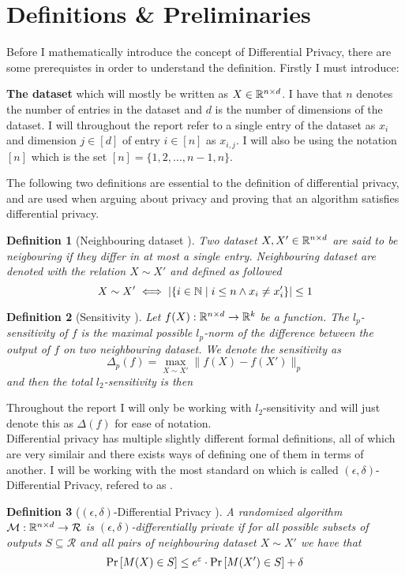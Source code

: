 \documentclass[a4paper,12pt]{article}
\newtheorem{definition}{Definition}[section]
\begin{document}
\section{Definitions \& Preliminaries}
Before I mathematically introduce the concept of Differential Privacy, there are some prerequistes in order to understand the definition.
Firstly I must introduce:

\textbf{The dataset} which will mostly be written as $X \in \mathbb{R}^{n \times d}$.
I have that $n$ denotes the number of entries in the dataset and 
$d$ is the number of dimensions of the dataset.
I will throughout the report refer to a single entry of 
the dataset as $x_i$ and dimension $j \in [d]$ of entry $i \in [n]$ as $x_{i,j}$.
I will also be using the notation $[n]$ which is the set $[n] = \{1,2,\dots,n-1, n\}$.
\vspace*{0.3cm}

\noindent The following two definitions are essential to the definition of differential privacy, and are used
when arguing about privacy and proving that an algorithm satisfies differential privacy.
\begin{definition}[Neighbouring dataset \cite{dpbasic}]
Two dataset $X, X' \in \mathbb{R}^{n \times d}$ are said to be 
neigbouring if they differ in at most a single entry.
Neighbouring dataset are denoted with the relation $X \sim X'$ and defined as followed
\[ X \sim X' \iff \left | \left \{ i \in \mathbb{N} \; \text{\textbar} \; i \le n \land x_i \ne x_i' \right\} \right| \le 1 \]
\end{definition}

\begin{definition}[Sensitivity ] %
\label{def:sensitivity}
Let $f(X): \mathbb{R}^{n \times d} \rightarrow \mathbb{R}^k$ be a function. 
The $l_p$-sensitivity of $f$ is the maximal 
possible $l_p$-norm of the difference between the output of $f$ 
on two neighbouring dataset.
We denote the sensitivity as 
\[
\Delta_p (f) = \max_{X \sim X'} \| f(X) - f(X') \|_p 
\]
and then the total $l_2$-sensitivity is then
\end{definition}
\noindent Throughout the report I will only be working with $l_2$-sensitivity and
will just denote this as $\Delta(f)$ for ease of notation. \\

Differential privacy has multiple slightly different
formal definitions, all of which are very similair and there exists ways of
defining one of them in terms of another.
I will be working with the most standard on which is called $(\epsilon, \delta)$-Differential Privacy,
refered to as \edp.
\vspace*{0.3cm}
\begin{definition}[$(\epsilon, \delta)$-Differential Privacy ]

A randomized algorithm $\mathcal{M}: \mathbb{R}^{n \times d} \rightarrow \mathcal{R}$ 
is $(\epsilon, \delta)$-differentially private if for all possible 
subsets of outputs $S \subseteq \mathcal{R}$ and all pairs of 
neighbouring dataset $X \sim X'$ we have that
\[ \Pr\left [M(X) \in S \right] \le e^{\varepsilon} \cdot \Pr\left [M(X') \in S \right] + \delta \]

\end{definition}
\end{document}
